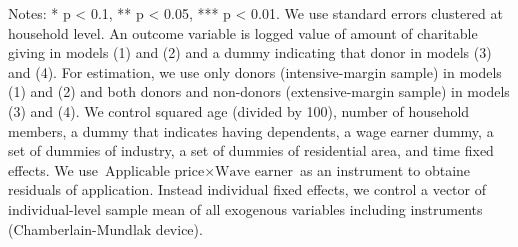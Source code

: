 \begin{table}
\begin{threeparttable}
\begin{tablenotes}
\item Notes: * p < 0.1, ** p < 0.05, *** p < 0.01. We use standard errors clustered at household level. An outcome variable is logged value of amount of charitable giving in models (1) and (2) and a dummy indicating that donor in models (3) and (4). For estimation, we use only donors (intensive-margin sample) in models (1) and (2) and both donors and non-donors (extensive-margin sample) in models (3) and (4). We control squared age (divided by 100), number of household members, a dummy that indicates having dependents, a wage earner dummy, a set of dummies of industry, a set of dummies of residential area, and time fixed effects. We use $\text{Applicable price}\times\text{Wave earner}$ as an instrument to obtaine residuals of application. Instead individual fixed effects, we control a vector of individual-level sample mean of all exogenous variables including instruments (Chamberlain-Mundlak device).
\end{tablenotes}
\end{threeparttable}
\end{table}
